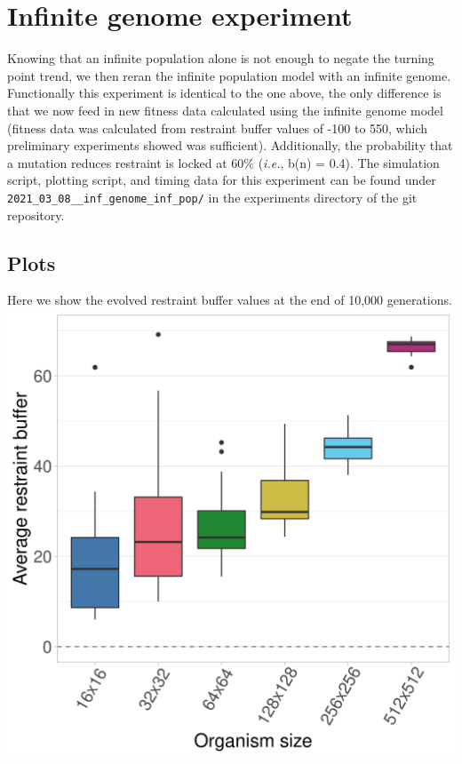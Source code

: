 \documentclass[
]{book}
\begin{document}
\hypertarget{infinite-genome-experiment-1}{%
\section{Infinite genome experiment}\label{infinite-genome-experiment-1}}

Knowing that an infinite population alone is not enough to negate the turning point trend, we then reran the infinite population model with an infinite genome.
Functionally this experiment is identical to the one above, the only difference is that we now feed in new fitness data calculated using the infinite genome model (fitness data was calculated from restraint buffer values of -100 to 550, which preliminary experiments showed was sufficient).
Additionally, the probability that a mutation reduces restraint is locked at 60\% (\emph{i.e.}, b(n) = 0.4).
The simulation script, plotting script, and timing data for this experiment can be found under \texttt{2021\_03\_08\_\_inf\_genome\_inf\_pop/} in the experiments directory of the git repository.

\hypertarget{plots-1}{%
\subsection{Plots}\label{plots-1}}

Here we show the evolved restraint buffer values at the end of 10,000 generations.
\includegraphics{./inf_pop/inf_evolved_boxplots.png}
\end{document}
